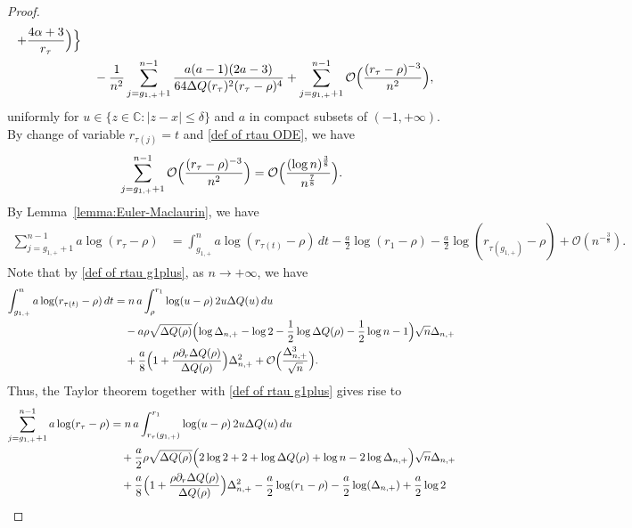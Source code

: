 \documentclass[10pt,a4paper]{amsart}
\newcommand{\C}{\mathds{C}}
\begin{document}
\begin{proof}
\begin{align*}
+\frac{4\alpha+3}{r_{\tau}}
\Bigr)
\Bigr\}
\\
&\quad
-\frac{1}{n^2}
\sum_{j=g_{1,+}+1}^{n-1}
\frac{a(a-1)(2a-3)}{64\Delta Q(r_{\tau})^2(r_{\tau}-\rho)^4}
+
\sum_{j=g_{1,+}+1}^{n-1}
\mathcal{O}\Bigl(\frac{(r_{\tau}-\rho)^{-3}}{n^2}\Bigr), 
\end{align*} 
uniformly for $u\in\{z\in\C:|z-x|\leq \delta\}$ and $a$ in compact subsets of $(-1,+\infty)$. 
By change of variable $r_{\tau(j)}=t$ and \eqref{def of rtau ODE}, we have 
\begin{equation}
\label{def of summation in 4 S3}
\sum_{j=g_{1,+}+1}^{n-1}
\mathcal{O}\Bigl(\frac{(r_{\tau}-\rho)^{-3}}{n^2}\Bigr)
=
\mathcal{O}\Bigl(\frac{(\log n)^{\frac{3}{8}}}{n^{\frac{7}{8}}}\Bigr). 
\end{equation}
By Lemma~\ref{lemma:Euler-Maclaurin}, we have 
\begin{align*}
\sum_{j=g_{1,+}+1}^{n-1}a\log(r_{\tau}-\rho)
&=  
\int_{g_{1,+}}^{n}a\log(r_{\tau(t)}-\rho)\,dt
-\frac{a}{2}\log(r_1-\rho)-\frac{a}{2}\log(r_{\tau(g_{1,+})}-\rho)
+\mathcal{O}(n^{-\frac{3}{8}}). 
\end{align*} 
Note that by \eqref{def of rtau g1plus}, as $n\to+\infty$, we have 
\begin{align*}
\int_{g_{1,+}}^{n}a\log(r_{\tau(t)}-\rho)\,dt
&=n\,a\int_{\rho}^{r_1}\log (u-\rho)\,2u\Delta Q(u)\,du
\\
&\quad
-a\rho\sqrt{\Delta Q(\rho)}
\Bigl( 
\log\Delta_{n,+}-\log 2-\frac{1}{2}\log\Delta Q(\rho)-\frac{1}{2}\log n-1
\Bigr)\sqrt{n}\Delta_{n,+}
\\
&\quad
+\frac{a}{8}\Bigl(1+\frac{\rho\partial_r\Delta Q(\rho)}{\Delta Q(\rho)}\Bigr)\Delta_{n,+}^2
+
\mathcal{O}\Bigl( 
\frac{\Delta_{n,+}^3}{\sqrt{n}}
\Bigr).
\end{align*}
Thus, the Taylor theorem together with \eqref{def of rtau g1plus} gives rise to
\begin{align}
\begin{split}
\label{def of summation in 1 S3}
\sum_{j=g_{1,+}+1}^{n-1}a\log(r_{\tau}-\rho)
&=  
n\,a\int_{r_{\tau}(g_{1,+})}^{r_1}\log (u-\rho)\,2u\Delta Q(u)\,du
\\
&\quad
+\frac{a}{2}\rho\sqrt{\Delta Q(\rho)}
\Bigl( 
2\log 2+2+\log\Delta Q(\rho)+\log n
-2\log\Delta_{n,+}
\Bigr)\sqrt{n}\Delta_{n,+}
\\
&\quad
+\frac{a}{8}\Bigl(1+\frac{\rho\partial_r\Delta Q(\rho)}{\Delta Q(\rho)}\Bigr)\Delta_{n,+}^2
-\frac{a}{2}\log(r_1-\rho)
-\frac{a}{2}\log(\Delta_{n,+})
+\frac{a}{2}\log2
\\

\end{split}
\end{align}
\end{proof}
\end{document}
